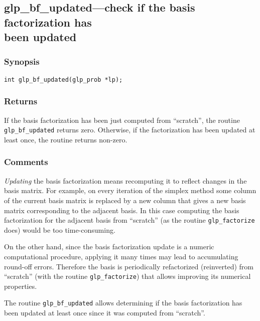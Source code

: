 
\newpage

\subsection{glp\_bf\_updated---check if the basis factorization has\\
been updated}

\subsubsection*{Synopsis}

\begin{verbatim}
int glp_bf_updated(glp_prob *lp);
\end{verbatim}

\subsubsection*{Returns}

If the basis factorization has been just computed from ``scratch'', the
routine \verb|glp_bf_updated| returns zero. Otherwise, if the
factorization has been updated at least once, the routine returns
non-zero.

\subsubsection*{Comments}

{\it Updating} the basis factorization means recomputing it to reflect
changes in the basis matrix. For example, on every iteration of the
simplex method some column of the current basis matrix is replaced by a
new column that gives a new basis matrix corresponding to the adjacent
basis. In this case computing the basis factorization for the adjacent
basis from ``scratch'' (as the routine \verb|glp_factorize| does) would
be too time-consuming.

On the other hand, since the basis factorization update is a numeric
computational procedure, applying it many times may lead to accumulating
round-off errors. Therefore the basis is periodically refactorized
(reinverted) from ``scratch'' (with the routine \verb|glp_factorize|)
that allows improving its numerical properties.

The routine \verb|glp_bf_updated| allows determining if the basis
factorization has been updated at least once since it was computed from
``scratch''.

